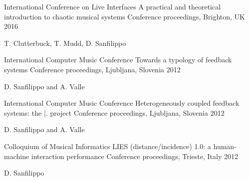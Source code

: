 \begin{cventries}
  \cventry
    {International Conference on Live Interfaces} %
    {A practical and theoretical introduction to chaotic musical systems} %
    {Conference proceedings, Brighton, UK} %
    {2016} %
    {
      \begin{cvitems} %
        \item {T. Clutterbuck, T. Mudd, D. Sanfilippo}
      \end{cvitems}
    }

  \cventry
    {International Computer Music Conference} %
    {Towards a typology of feedback systems} %
    {Conference proceedings, Ljubljana, Slovenia} %
    {2012} %
    {
      \begin{cvitems} %
        \item {D. Sanfilippo and A. Valle}
      \end{cvitems}
    }

  \cventry
    {International Computer Music Conference} %
    {Heterogeneously coupled feedback systems: the |. project} %
    {Conference proceedings, Ljubljana, Slovenia} %
    {2012} %
    {
      \begin{cvitems} %
        \item {D. Sanfilippo and A. Valle}
      \end{cvitems}
    }

  \cventry
    {Colloquium of Musical Informatics} %
    {LIES (distance/incidence) 1.0: a human-machine interaction performance} %
    {Conference proceedings, Trieste, Italy} %
    {2012} %
    {
      \begin{cvitems} %
        \item {D. Sanfilippo}
      \end{cvitems}
    }

\end{cventries}

